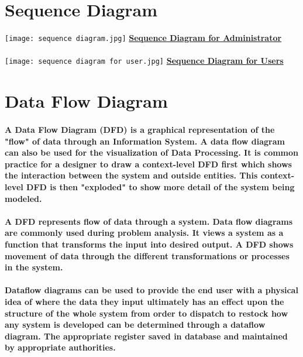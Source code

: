 \documentclass[12pt]{report}
\begin{document}
        \section{Sequence Diagram}
        \begin{center}
            \texttt{[image: sequence diagram.jpg]}
            \textbf{\underline{Sequence Diagram for Administrator}}
            \paragraph{}
            \texttt{[image: sequence diagram for user.jpg]}
            \textbf{\underline{Sequence Diagram for Users}}
        \end{center}
        
        \section{Data Flow Diagram}
        \paragraph
        {
        A Data Flow Diagram (DFD) is a graphical representation of the "flow" of data through an Information System. A data flow diagram can also be used for the visualization of Data Processing. It is common practice for a designer to draw a context-level DFD first which shows the interaction between the system and outside entities. This context-level DFD is then "exploded" to show more detail of the system being modeled.
        }
        \paragraph
        {
        A DFD represents flow of data through a system. Data flow diagrams are commonly used during problem analysis. It views a system as a function that transforms the input into desired output. A DFD shows movement of data through the different transformations or processes in the system.
        }
        \paragraph
        {
         Dataflow diagrams can be used to provide the end user with a physical idea of where the data they input ultimately has an effect upon the structure of the whole system from order to dispatch to restock how any system is developed can be determined through a dataflow diagram. The appropriate register saved in database and maintained by appropriate authorities.
        }
        
\end{document}
